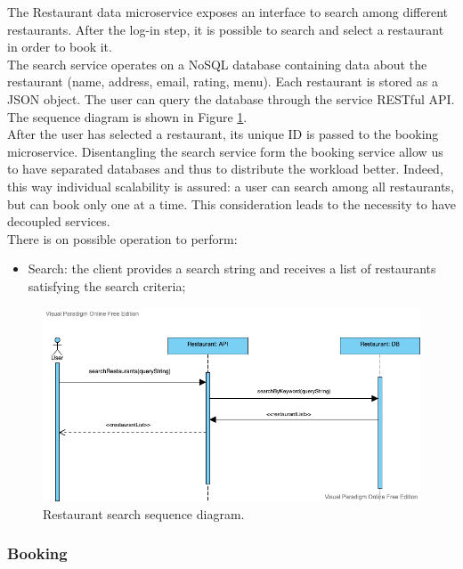 The Restaurant data microservice exposes an interface to search among different restaurants. After the log-in step, it is possible to search and select a restaurant in order to book it. \\
The search service operates on a NoSQL database containing data about the restaurant (name, address, email, rating, menu). Each restaurant is stored as a JSON object. The user can query the database through the service RESTful API. The sequence diagram is shown in Figure \ref{fig:restaurant_search}. \\
After the user has selected a restaurant, its unique ID is passed to the booking microservice. Disentangling the search service form the booking service allow us to have separated databases and thus to distribute the workload better. Indeed, this way individual scalability is assured: a user can search among all restaurants, but can book only one at a time. This consideration leads to the necessity to have decoupled services. \\
There is on possible operation to perform:

\begin{itemize}
    \item Search: the client provides a search string and receives a list of restaurants satisfying the search criteria;
\end{itemize}

\begin{figure}[h]
    \includegraphics[width=\linewidth]{../docs/sequence/search/search.png}
    \caption{Restaurant search sequence diagram.}
    \label{fig:restaurant_search}
\end{figure}

\subsubsection{Booking}

